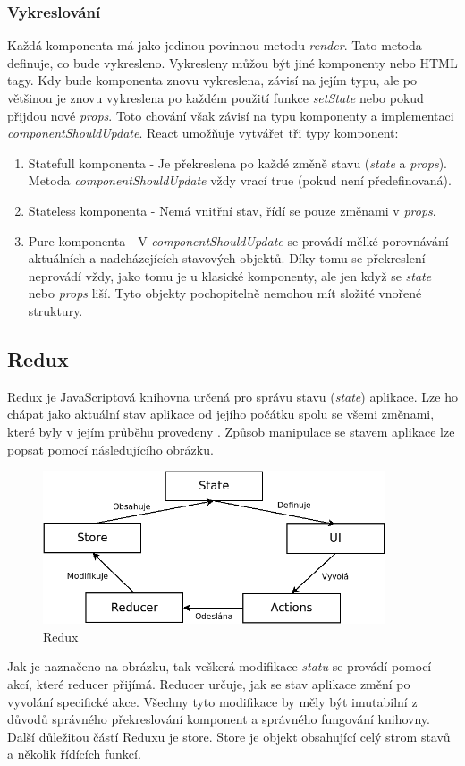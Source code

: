 \documentclass[thesis=M,czech]{FITthesis}[2018/10/20]
\begin{document}
	\subsubsection{Vykreslování}
Každá komponenta má jako jedinou povinnou metodu \textit{render}. Tato metoda definuje, co bude vykresleno. Vykresleny můžou být jiné komponenty nebo HTML tagy. Kdy bude komponenta znovu vykreslena, závisí na jejím typu, ale po většinou je znovu vykreslena po každém použití funkce \textit{setState} nebo pokud přijdou nové \textit{props}. Toto chování však závisí na typu komponenty a implementaci \textit{componentShouldUpdate}. React umožňuje vytvářet tři typy komponent:  
\begin{enumerate}
\item Statefull komponenta - Je překreslena po každé změně stavu (\textit{state} a \textit{props}). Metoda \textit{componentShouldUpdate} vždy vrací true (pokud není předefinovaná).  
\item Stateless komponenta - Nemá vnitřní stav, řídí se pouze změnami v \textit{props}.
\item Pure komponenta - V \textit{componentShouldUpdate} se provádí mělké porovnávání aktuálních a nadcházejících stavových objektů. Díky tomu se překreslení neprovádí vždy, jako tomu je u klasické komponenty, ale jen když se \textit{state} nebo \textit{props} liší. Tyto objekty pochopitelně nemohou mít složité vnořené struktury.
\end{enumerate}
\newpage
\subsection{Redux}	
Redux je JavaScriptová knihovna určená pro správu stavu (\textit{state}) aplikace. Lze ho chápat jako aktuální stav aplikace od jejího počátku spolu se všemi změnami, které byly v jejím průběhu provedeny \cite{react-redux}. Způsob manipulace se stavem aplikace lze popsat pomocí následujícího obrázku.\bigbreak
\begin{figure}[h]
\caption{Redux}
\centering
\includegraphics[width=0.9\textwidth]{diagrams/redux}
\end{figure}
Jak je naznačeno na obrázku, tak veškerá modifikace \textit{statu} se provádí pomocí akcí, které reducer přijímá. Reducer určuje, jak se stav aplikace změní po vyvolání specifické akce. Všechny tyto modifikace by měly být imutabilní z důvodů správného překreslování komponent a správného fungování knihovny. Další důležitou částí Reduxu je store. Store je objekt obsahující celý strom stavů a několik řídících funkcí.
\end{document}

